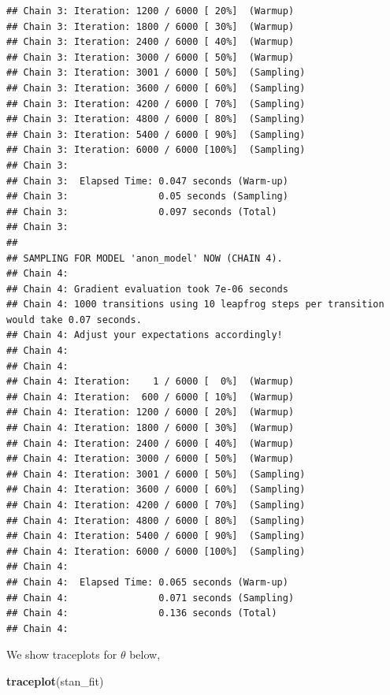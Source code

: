 \documentclass[
]{article}
\newenvironment{Shaded}{\begin{snugshade}}{\end{snugshade}}
\newcommand{\FunctionTok}[1]{\textcolor[rgb]{0.13,0.29,0.53}{\textbf{#1}}}
\newcommand{\NormalTok}[1]{#1}
\begin{document}
\begin{verbatim}
## Chain 3: Iteration: 1200 / 6000 [ 20%]  (Warmup)
## Chain 3: Iteration: 1800 / 6000 [ 30%]  (Warmup)
## Chain 3: Iteration: 2400 / 6000 [ 40%]  (Warmup)
## Chain 3: Iteration: 3000 / 6000 [ 50%]  (Warmup)
## Chain 3: Iteration: 3001 / 6000 [ 50%]  (Sampling)
## Chain 3: Iteration: 3600 / 6000 [ 60%]  (Sampling)
## Chain 3: Iteration: 4200 / 6000 [ 70%]  (Sampling)
## Chain 3: Iteration: 4800 / 6000 [ 80%]  (Sampling)
## Chain 3: Iteration: 5400 / 6000 [ 90%]  (Sampling)
## Chain 3: Iteration: 6000 / 6000 [100%]  (Sampling)
## Chain 3: 
## Chain 3:  Elapsed Time: 0.047 seconds (Warm-up)
## Chain 3:                0.05 seconds (Sampling)
## Chain 3:                0.097 seconds (Total)
## Chain 3: 
## 
## SAMPLING FOR MODEL 'anon_model' NOW (CHAIN 4).
## Chain 4: 
## Chain 4: Gradient evaluation took 7e-06 seconds
## Chain 4: 1000 transitions using 10 leapfrog steps per transition would take 0.07 seconds.
## Chain 4: Adjust your expectations accordingly!
## Chain 4: 
## Chain 4: 
## Chain 4: Iteration:    1 / 6000 [  0%]  (Warmup)
## Chain 4: Iteration:  600 / 6000 [ 10%]  (Warmup)
## Chain 4: Iteration: 1200 / 6000 [ 20%]  (Warmup)
## Chain 4: Iteration: 1800 / 6000 [ 30%]  (Warmup)
## Chain 4: Iteration: 2400 / 6000 [ 40%]  (Warmup)
## Chain 4: Iteration: 3000 / 6000 [ 50%]  (Warmup)
## Chain 4: Iteration: 3001 / 6000 [ 50%]  (Sampling)
## Chain 4: Iteration: 3600 / 6000 [ 60%]  (Sampling)
## Chain 4: Iteration: 4200 / 6000 [ 70%]  (Sampling)
## Chain 4: Iteration: 4800 / 6000 [ 80%]  (Sampling)
## Chain 4: Iteration: 5400 / 6000 [ 90%]  (Sampling)
## Chain 4: Iteration: 6000 / 6000 [100%]  (Sampling)
## Chain 4: 
## Chain 4:  Elapsed Time: 0.065 seconds (Warm-up)
## Chain 4:                0.071 seconds (Sampling)
## Chain 4:                0.136 seconds (Total)
## Chain 4:
\end{verbatim}

We show traceplots for \(\theta\) below,

\begin{Shaded}
\begin{Highlighting}[]
\FunctionTok{traceplot}\NormalTok{(stan\_fit)}
\end{Highlighting}
\end{Shaded}
\end{document}

